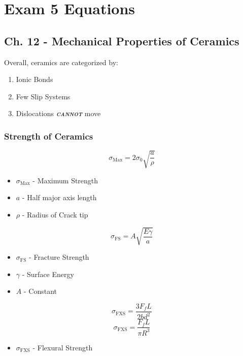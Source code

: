 \section{Exam 5 Equations}
	\subsection{Ch. 12 - Mechanical Properties of Ceramics} \label{subsec:Ch12 Mechanical Properties of Ceramics}
	Overall, ceramics are categorized by:
		\begin{enumerate}[noitemsep]
			\item Ionic Bonds
			\item Few Slip Systems
			\item Dislocations \emph{\textbf{\textsc{cannot}}} move
		\end{enumerate}
	
		\subsubsection{Strength of Ceramics} \label{subsubsec:Ceramics Strength}
			\begin{equation} \label{eq:Ceramics Max Strength}
				\sigma_{\text{Max}} = 2 \sigma_{0} \sqrt{\frac{a}{\rho}}
			\end{equation}
			\begin{itemize}[noitemsep]
				\item $\sigma_{\text{Max}}$ - Maximum Strength
				\item $a$ - Half major axis length
				\item $\rho$ - Radius of Crack tip
			\end{itemize}
		
			\begin{equation} \label{eq:Ceramics Fracture Strength}
				\sigma_{\text{FS}} = A \sqrt{\frac{E \gamma}{a}}
			\end{equation}
			\begin{itemize}[noitemsep]
				\item $\sigma_{\text{FS}}$ - Fracture Strength
				\item $\gamma$ - Surface Energy
				\item $A$ - Constant
			\end{itemize}
			
			\begin{equation} \label{eq:Flexural Strength}
				\sigma_{\text{FXS}} = \frac{3 F_{f} L}{2 b d^{2}}
			\end{equation}
			\begin{equation}
				\sigma_{\text{FXS}} = \frac{F_{f} L}{\pi R^{3}}
			\end{equation}
			\begin{itemize}[noitemsep]
				\item $\sigma_{\text{FXS}}$ - Flexural Strength
			\end{itemize}
	
